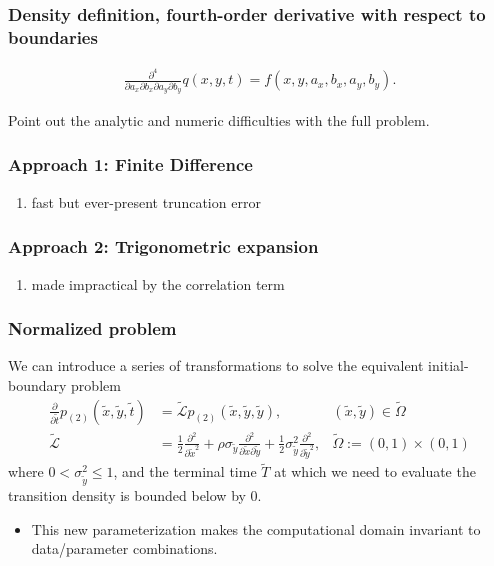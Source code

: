 \documentclass{beamer}
\begin{document}
\begin{frame}
  \frametitle{Density definition, fourth-order derivative with respect to boundaries}

\begin{align}
  \frac{\partial^4}{\partial a_x \partial b_x \partial a_y \partial b_y} q(x,y,t) = f(x,y,a_x,b_x,a_y,b_y).
  \label{eq:pdf}
\end{align}
  
  Point out the analytic and numeric difficulties with the full problem.
\end{frame}
\begin{frame}
  \frametitle{Approach 1: Finite Difference}
  \begin{enumerate}
  \item fast but ever-present truncation error
  \end{enumerate}
\end{frame}
\begin{frame}
  \frametitle{Approach 2: Trigonometric expansion}
  \begin{enumerate}
  \item made impractical by the correlation term
  \end{enumerate}
\end{frame}
\begin{frame}
  \frametitle{Normalized problem}
  We can introduce a series of transformations to solve the equivalent initial-boundary problem
  \begin{align*}
    \frac{\partial}{\partial \tilde{t}} p_{(2)}(\tilde{x},\tilde{y},\tilde{t}) &= \tilde{\mathcal{L}} p_{(2)}(\tilde{x},\tilde{y},\tilde{y}), & (\tilde{x}, \tilde{y}) \in \tilde{\Omega} \\
    \tilde{\mathcal{L}} &= \frac{1}{2} \frac{\partial^2}{\partial \tilde{x}^2} + \rho \sigma_{\tilde{y}} \frac{\partial^2}{\partial \tilde{x} \partial \tilde{y}} + \frac{1}{2} \sigma^2_{\tilde{y}} \frac{\partial^2}{\partial \tilde{y}^2},& \tilde{\Omega} := (0,1) \times (0,1)
  \end{align*}
  where $0 < \sigma_{\tilde{y}}^2 \leq 1$, and the terminal time
  $\tilde{T}$ at which we need to evaluate the transition density is
  bounded below by $0$.

  \begin{itemize}
  \item This new parameterization makes the computational domain invariant
  to data/parameter combinations.
  \end{itemize}
\end{frame}
\end{document}
